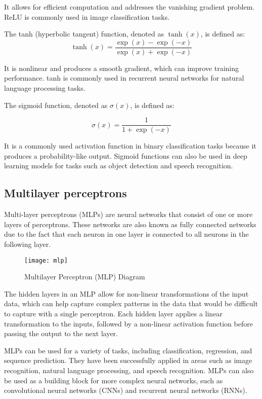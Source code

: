 It allows for efficient computation and addresses the vanishing gradient problem. 
ReLU is commonly used in image classification tasks.

The tanh (hyperbolic tangent) function, denoted as $\tanh(x)$, is defined as:
\begin{equation}
  \tanh(x) = \frac{\exp(x) - \exp(-x)}{\exp(x) + \exp(-x)}
\end{equation}

It is nonlinear and produces a smooth gradient, which can improve training performance. 
tanh is commonly used in recurrent neural networks for natural language processing tasks.

The sigmoid function, denoted as $\sigma(x)$, is defined as:

\begin{equation}
  \sigma(x) = \frac{1}{1 + \exp(-x)}
\end{equation}

It is a commonly used activation function in binary classification tasks because it produces a probability-like output.
Sigmoid functions can also be used in deep learning models for tasks such as object detection and speech recognition.

\subsection{Multilayer perceptrons}

Multi-layer perceptrons (MLPs) \cite{aggarwal2018neural, goodfellow2016deep} are neural networks that consist of one or more layers of perceptrons. 
These networks are also known as fully connected networks due to the fact that each neuron in one layer is connected to all neurons in the following layer.

\begin{figure}[H]
  \centering
  \texttt{[image: mlp]}
  \caption{Multilayer Perceptron (MLP) Diagram \cite{uc}}
\end{figure}

The hidden layers in an MLP allow for non-linear transformations of the input data, which can help capture complex patterns in the data that would be difficult to capture with a single perceptron. 
Each hidden layer applies a linear transformation to the inputs, followed by a non-linear activation function before passing the output to the next layer.

MLPs can be used for a variety of tasks, including classification, regression, and sequence prediction. 
They have been successfully applied in areas such as image recognition, natural language processing, and speech recognition. MLPs can also be used as a building block for more complex neural networks, such as convolutional neural networks (CNNs) and recurrent neural networks (RNNs).

